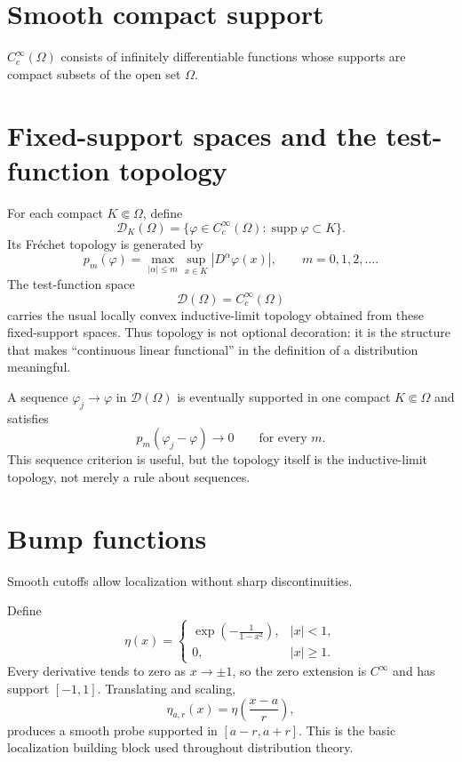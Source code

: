 \section{Smooth compact support}
$C_c^\infty(\Omega)$ consists of infinitely differentiable functions whose supports are compact subsets of the open set $\Omega$.

\section{Fixed-support spaces and the test-function topology}
For each compact \(K\Subset\Omega\), define
\[
\mathcal D_K(\Omega)
=
\{\varphi\in C_c^\infty(\Omega):
\operatorname{supp}\varphi\subset K\}.
\]
Its Fr\'echet topology is generated by
\[
p_m(\varphi)
=
\max_{|\alpha|\le m}\sup_{x\in K}|D^\alpha\varphi(x)|,
\qquad m=0,1,2,\ldots.
\]
The test-function space
\[
\mathcal D(\Omega)=C_c^\infty(\Omega)
\]
carries the usual locally convex inductive-limit topology obtained from these
fixed-support spaces. Thus topology is not optional decoration: it is the
structure that makes ``continuous linear functional'' in the definition of a
distribution meaningful.

A sequence \(\varphi_j\to\varphi\) in \(\mathcal D(\Omega)\) is eventually
supported in one compact \(K\Subset\Omega\) and satisfies
\[
p_m(\varphi_j-\varphi)\to0
\qquad\text{for every }m.
\]
This sequence criterion is useful, but the topology itself is the
inductive-limit topology, not merely a rule about sequences.

\section{Bump functions}
Smooth cutoffs allow localization without sharp discontinuities.


\begin{example}\label{ex:iii15-expand-01}
Define
\[
\eta(x)=
\begin{cases}
\exp\!\left(-\frac{1}{1-x^2}\right),& |x|<1,\\
0,& |x|\ge1.
\end{cases}
\]
Every derivative tends to zero as \(x\to\pm1\), so the zero extension is
\(C^\infty\) and has support \([-1,1]\). Translating and scaling,
\[
\eta_{a,r}(x)=\eta\!\left(\frac{x-a}{r}\right),
\]
produces a smooth probe supported in \([a-r,a+r]\). This is the basic
localization building block used throughout distribution theory.
\end{example}
